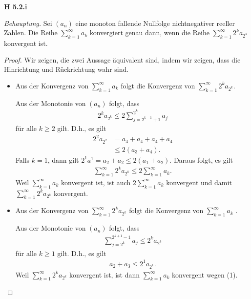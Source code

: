 \documentclass[12pt]{extarticle}
\begin{document}
\newpage

\textbf{H 5.2.i}

\textit{Behauptung.} Sei \((a_n)\) eine monoton fallende Nullfolge
nichtnegativer reeller Zahlen.  Die Reihe \(\sum_{k=1}^{\infty}{a_k}\)
konvergiert genau dann, wenn die Reihe
\(\sum_{k=1}^{\infty}{2^ka_{2^k}}\) konvergent ist.

\begin{proof}
  Wir zeigen, die zwei Aussage äquivalent sind, indem wir zeigen, dass
  die Hinrichtung und Rückrichtung wahr sind.
  \begin{itemize}
  \item Aus der Konvergenz von  \(\sum_{k=1}^{\infty}{a_k}\) folgt die
    Konvergenz von \(\sum_{k=1}^{\infty}{2^ka_{2^k}}\).

    Aus der Monotonie von \((a_n)\) folgt, dass
\begin{align*}
2^ka_{2^k} \leq 2\sum_{j=2^{k-1}+1}^{2^k}{a_j}
\end{align*}
für alle \(k \geq 2\) gilt.  D.h., es gilt
\begin{align*}
  2^2a_{2^2} &= a_4 + a_4 + a_4 + a_4\\
             &\leq 2(a_3+a_4).
\end{align*}
Falls \(k=1\), dann gilt \(2^1a^1=a_2+a_2\leq 2(a_1+a_2)\).  Daraus folgt,
es gilt
\begin{align*}
 \sum_{k=1}^{\infty}{2^ka_{2^k}} \leq 2\sum_{k=1}^{\infty}{a_k}.
\end{align*}
Weil \(\sum_{k=1}^{\infty}{a_k}\) konvergent ist, ist auch
\(2\sum_{k=1}^{\infty}{a_k}\) konvergent und damit
\(\sum_{k=1}^{\infty}{2^ka_{2^k}}\) konvergent.
  \item Aus der Konvergenz von \(\sum_{k=1}^{\infty}{2^ka_{2^k}}\) folgt die
    Konvergenz von \(\sum_{k=1}^{\infty}{a_k}\) .

    Aus der Monotonie von \((a_n)\) folgt, dass
\begin{align*}
\sum_{j =2^k}^{2^{k+1}-1}{a_j} \leq 2^ka_{2^k} \tag{1}
\end{align*}
für alle \(k \geq 1\) gilt.  D.h., es gilt
\begin{align*}
a_2+a_3 \leq 2^1a_{2^1}.
\end{align*}
Weil \(\sum_{k=1}^{\infty}{2^ka_{2^k}}\) konvergent ist, ist dann
\(\sum_{k=1}^{\infty}{a_k}\) konvergent wegen (1).
  \end{itemize}

\end{proof}
\end{document}
